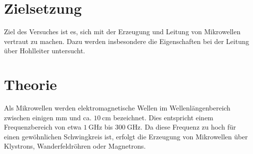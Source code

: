 
\section{Zielsetzung}
Ziel des Versuches ist es, sich mit der Erzeugung und Leitung von Mikrowellen vertraut zu machen.
Dazu werden insbesondere die Eigenschaften bei der Leitung über Hohlleiter untersucht.

\section{Theorie}
Als Mikrowellen werden elektromagnetische Wellen im Wellenlängenbereich zwischen einigen $\si{\milli\meter}$
und ca. $\SI{10}{\centi\meter}$ bezeichnet. Dies entspricht einem Frequenzbereich von etwa
$\SI{1}{\giga\hertz}$ bis $\SI{300}{\giga\hertz}$.  Da diese Frequenz zu hoch für einen gewöhnlichen
Schwingkreis ist, erfolgt die Erzeugung von Mikrowellen über Klystrons, Wanderfeldröhren oder Magnetrons.

